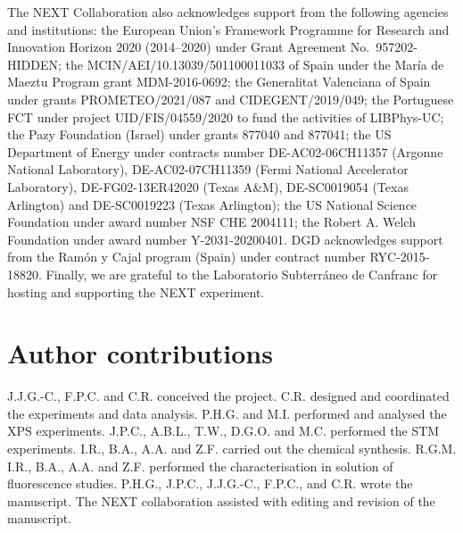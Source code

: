 \documentclass[aps,prl,reprint,longbibliography,superscriptaddress, english]{revtex4-1}
\begin{document}
The NEXT Collaboration also acknowledges support from the following agencies and institutions: the European Union's Framework Programme for Research and Innovation Horizon 2020 (2014--2020) under Grant Agreement No.\ 957202-HIDDEN; the MCIN/AEI/10.13039/501100011033 of Spain under the Mar\'ia de Maeztu Program grant MDM-2016-0692; the Generalitat Valenciana of Spain under grants PROMETEO/2021/087 and CIDEGENT/2019/049; the Portuguese FCT under project UID/FIS/04559/2020 to fund the activities of LIBPhys-UC; the Pazy Foundation (Israel) under grants 877040 and 877041; the US Department of Energy under contracts number DE-AC02-06CH11357 (Argonne National Laboratory), DE-AC02-07CH11359 (Fermi National Accelerator Laboratory), DE-FG02-13ER42020 (Texas A\&M), DE-SC0019054 (Texas Arlington) and DE-SC0019223 (Texas Arlington); the US National Science Foundation under award number NSF CHE 2004111; the Robert A. Welch Foundation under award number Y-2031-20200401. DGD acknowledges support from the Ram\'on y Cajal program (Spain) under contract number RYC-2015-18820. Finally, we are grateful to the Laboratorio Subterr\'aneo de Canfranc for hosting and supporting the NEXT experiment.


\section{Author contributions}
J.J.G.-C., F.P.C. and C.R. conceived the project. C.R. designed and coordinated the experiments and data analysis. P.H.G. and M.I. performed and analysed the XPS experiments. J.P.C., A.B.L., T.W., D.G.O. and M.C. performed the STM experiments. I.R., B.A., A.A. and Z.F. carried out the chemical synthesis. R.G.M. I.R., B.A., A.A. and Z.F. performed the characterisation in solution of fluorescence studies. P.H.G., J.P.C., J.J.G.-C., F.P.C., and C.R. wrote the manuscript. The NEXT collaboration assisted with editing and revision of the manuscript. 

%

 

\end{document}
